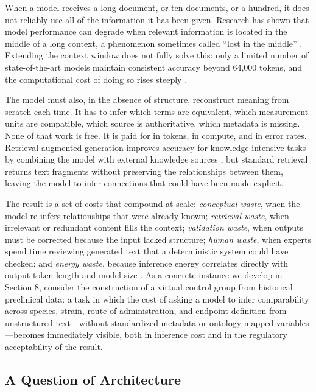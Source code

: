 \documentclass[man,12pt,donotrepeattitle]{apa7}
\begin{document}
When a model receives a long document, or ten documents, or a hundred, it
does not reliably use all of the information it has been given. Research
has shown that model performance can degrade when relevant information is
located in the middle of a long context, a phenomenon sometimes called
``lost in the middle'' \parencite{liu2024}. Extending the context window
does not fully solve this: only a limited number of state-of-the-art models
maintain consistent accuracy beyond 64,000 tokens, and the computational
cost of doing so rises steeply \parencite{leng2024}.

The model must also, in the absence of structure, reconstruct meaning from
scratch each time. It has to infer which terms are equivalent, which
measurement units are compatible, which source is authoritative, which
metadata is missing. None of that work is free. It is paid for in tokens,
in compute, and in error rates. Retrieval-augmented generation improves
accuracy for knowledge-intensive tasks by combining the model with external
knowledge sources \parencite{gao2024}, but standard retrieval returns text
fragments without preserving the relationships between them, leaving the
model to infer connections that could have been made explicit.

The result is a set of costs that compound at scale: \textit{conceptual
waste}, when the model re-infers relationships that were already known;
\textit{retrieval waste}, when irrelevant or redundant content fills the
context; \textit{validation waste}, when outputs must be corrected because
the input lacked structure; \textit{human waste}, when experts spend time
reviewing generated text that a deterministic system could have checked;
and \textit{energy waste}, because inference energy correlates directly
with output token length and model size \parencite{poddar2025,dauner2025}.
As a concrete instance we develop in Section 8, consider the construction
of a virtual control group from historical preclinical data: a task in
which the cost of asking a model to infer comparability across species,
strain, route of administration, and endpoint definition from unstructured
text---without standardized metadata or ontology-mapped variables---becomes
immediately visible, both in inference cost and in the regulatory
acceptability of the result.

\subsection{A Question of Architecture}
\end{document}
